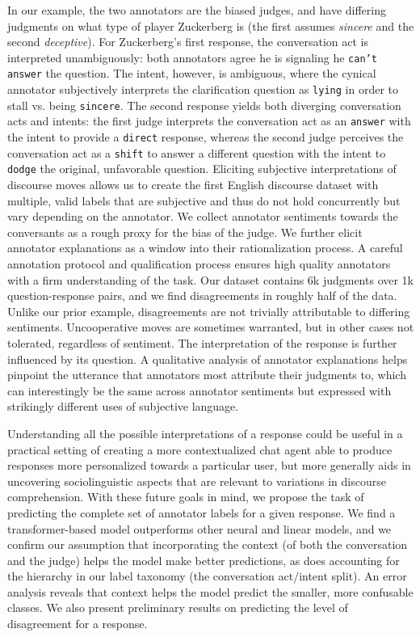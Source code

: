 In our example, the two annotators are the biased judges, and have differing judgments on what type of player Zuckerberg is (the first assumes \emph{sincere} and the second \emph{deceptive}). For Zuckerberg's first response, the conversation act is interpreted unambiguously: both annotators agree he is signaling he \texttt{can't answer} the question. The intent, however, is ambiguous, where the cynical annotator subjectively interprets the clarification question as \texttt{lying} in order to stall vs. being \texttt{sincere}. The second response yields both diverging conversation acts and intents: the first judge interprets the conversation act as an \texttt{answer} with the intent to provide a \texttt{direct} response, whereas the second judge perceives the conversation act as a \texttt{shift} to answer a different question with the intent to \texttt{dodge} the original, unfavorable question. Eliciting subjective interpretations of discourse moves allows us to create the first English discourse dataset with multiple, valid labels that are subjective and thus do not hold concurrently but vary depending on the annotator. We collect annotator sentiments towards the conversants as a rough proxy for the bias of the judge. We further elicit annotator explanations as a window into their rationalization process. A careful annotation protocol and qualification process ensures high quality annotators with a firm understanding of the task. Our dataset contains 6k judgments over 1k question-response pairs, and we find disagreements in roughly half of the data. Unlike our prior example, disagreements are not trivially attributable to differing sentiments. Uncooperative moves are sometimes warranted, but in other cases not tolerated, regardless of sentiment. The interpretation of the response is further influenced by its question. A qualitative analysis of annotator explanations helps pinpoint the utterance that annotators most attribute their judgments to, which can interestingly be the same across annotator sentiments but expressed with strikingly different uses of subjective language.


Understanding all the possible interpretations of a response could be useful in a practical setting of creating a more contextualized chat agent able to produce responses more personalized towards a particular user, but more generally aids in uncovering sociolinguistic aspects that are relevant to variations in discourse comprehension. With these future goals in mind, we propose the task of predicting the complete set of annotator labels for a given response. We find a transformer-based model outperforms other neural and linear models, and we confirm our assumption that incorporating the context (of both the conversation and the judge) helps the model make better predictions, as does accounting for the hierarchy in our label taxonomy (the conversation act/intent split). An error analysis reveals that context helps the model predict the smaller, more confusable classes. We also present preliminary results on predicting the level of disagreement for a response.

